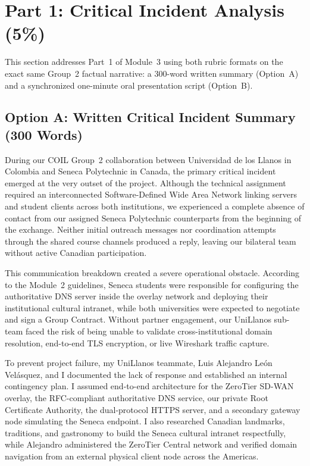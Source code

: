 \section{Part 1: Critical Incident Analysis (5\%)}

This section addresses Part~1 of Module~3 using both rubric formats on the exact same Group~2 factual narrative: a 300-word written summary (Option~A) and a synchronized one-minute oral presentation script (Option~B).

\subsection{Option A: Written Critical Incident Summary (300 Words)}

\begin{tcolorbox}[
    enhanced,
    breakable,
    colback=LightPanel,
    colframe=NavyPrimary,
    boxrule=0.8pt,
    arc=4pt,
    left=10pt,
    right=10pt,
    top=8pt,
    bottom=8pt,
    title={\textbf{Critical Incident Written Analysis --- Miguel \'Angel Rodr\'iguez Payares}},
    fonttitle=\small\bfseries,
    coltitle=white,
    colbacktitle=NavyPrimary
]
During our COIL Group~2 collaboration between Universidad de los Llanos in Colombia and Seneca Polytechnic in Canada, the primary critical incident emerged at the very outset of the project. Although the technical assignment required an interconnected Software-Defined Wide Area Network linking servers and student clients across both institutions, we experienced a complete absence of contact from our assigned Seneca Polytechnic counterparts from the beginning of the exchange. Neither initial outreach messages nor coordination attempts through the shared course channels produced a reply, leaving our bilateral team without active Canadian participation.

This communication breakdown created a severe operational obstacle. According to the Module~2 guidelines, Seneca students were responsible for configuring the authoritative DNS server inside the overlay network and deploying their institutional cultural intranet, while both universities were expected to negotiate and sign a Group Contract. Without partner engagement, our UniLlanos sub-team faced the risk of being unable to validate cross-institutional domain resolution, end-to-end TLS encryption, or live Wireshark traffic capture.

To prevent project failure, my UniLlanos teammate, Luis Alejandro Le\'on Vel\'asquez, and I documented the lack of response and established an internal contingency plan. I assumed end-to-end architecture for the ZeroTier SD-WAN overlay, the RFC-compliant authoritative DNS service, our private Root Certificate Authority, the dual-protocol HTTPS server, and a secondary gateway node simulating the Seneca endpoint. I also researched Canadian landmarks, traditions, and gastronomy to build the Seneca cultural intranet respectfully, while Alejandro administered the ZeroTier Central network and verified domain navigation from an external physical client node across the Americas.


\end{tcolorbox}
